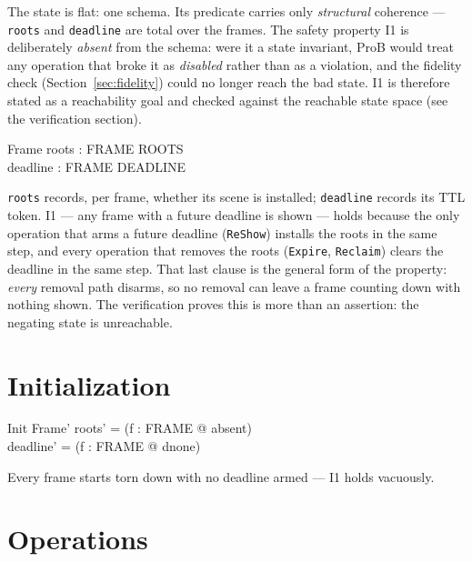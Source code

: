 \documentclass[a4paper,10pt,fleqn]{article}
\begin{document}
The state is flat: one schema. Its predicate carries only \emph{structural}
coherence --- \texttt{roots} and \texttt{deadline} are total over the frames. The
safety property I1 is deliberately \emph{absent} from the schema: were it a state
invariant, ProB would treat any operation that broke it as \emph{disabled} rather
than as a violation, and the fidelity check (Section~\ref{sec:fidelity}) could no
longer reach the bad state. I1 is therefore stated as a reachability goal and
checked against the reachable state space (see the verification section).

\begin{schema}{Frame}
  roots : FRAME \fun ROOTS \\
  deadline : FRAME \fun DEADLINE
\end{schema}

\texttt{roots} records, per frame, whether its scene is installed;
\texttt{deadline} records its TTL token. I1 --- any frame with a future deadline is
shown --- holds because the only operation that arms a future deadline
(\texttt{ReShow}) installs the roots in the same step, and every operation that
removes the roots (\texttt{Expire}, \texttt{Reclaim}) clears
the deadline in the same step. That last clause is the general form of the property:
\emph{every} removal path disarms, so no removal can leave a frame counting down with
nothing shown. The verification proves this is more than an assertion: the negating
state is unreachable.

\section{Initialization}

\begin{schema}{Init}
  Frame'
\where
  roots' = (\lambda f : FRAME @ absent) \\
  deadline' = (\lambda f : FRAME @ dnone)
\end{schema}

Every frame starts torn down with no deadline armed --- I1 holds vacuously.

\section{Operations}
\end{document}

